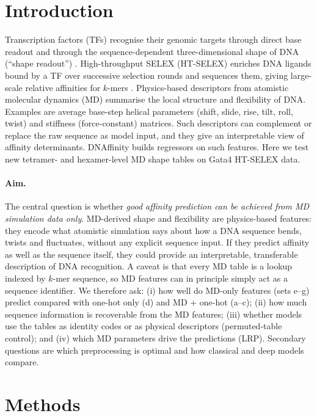 \documentclass[11pt,a4paper]{article}
\begin{document}
\section{Introduction}
Transcription factors (TFs) recognise their genomic targets through direct base readout and through the sequence-dependent three-dimensional shape of DNA (``shape readout'') \cite{rohs2009}. High-throughput SELEX (HT-SELEX) enriches DNA ligands bound by a TF over successive selection rounds and sequences them, giving large-scale relative affinities for $k$-mers \cite{jolma2013}. Physics-based descriptors from atomistic molecular dynamics (MD) summarise the local structure and flexibility of DNA. Examples are average base-step helical parameters (shift, slide, rise, tilt, roll, twist) and stiffness (force-constant) matrices. Such descriptors can complement or replace the raw sequence as model input, and they give an interpretable view of affinity determinants. DNAffinity builds regressors on such features. Here we test new tetramer- and hexamer-level MD shape tables on Gata4 HT-SELEX data.

\paragraph{Aim.} The central question is whether \emph{good affinity prediction can be achieved from MD simulation data only}. MD-derived shape and flexibility are physics-based features: they encode what atomistic simulation says about how a DNA sequence bends, twists and fluctuates, without any explicit sequence input. If they predict affinity as well as the sequence itself, they could provide an interpretable, transferable description of DNA recognition. A caveat is that every MD table is a lookup indexed by $k$-mer sequence, so MD features can in principle simply act as a sequence identifier. We therefore ask: (i) how well do MD-only features (sets e--g) predict compared with one-hot only (d) and MD + one-hot (a--c); (ii) how much sequence information is recoverable from the MD features; (iii) whether models use the tables as identity codes or as physical descriptors (permuted-table control); and (iv) which MD parameters drive the predictions (LRP). Secondary questions are which preprocessing is optimal and how classical and deep models compare.

\section{Methods}
\end{document}
